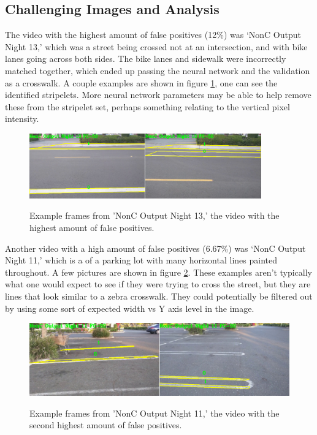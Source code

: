 \documentclass[12pt]{ucthesis}
\newcommand{\captionfonts}{\small\bf\ssp}
\begin{document}
\subsection{Challenging Images and Analysis}

The video with the highest amount of false positives (12\%) was `NonC Output Night 13,' which was a street being crossed not at an intersection, and with bike lanes going across both sides. The bike lanes and sidewalk were incorrectly matched together, which ended up passing the neural network and the validation as a crosswalk. A couple examples are shown in figure \ref{fig:worstFalsePosPic}, one can see the identified stripelets. More neural network parameters may be able to help remove these from the stripelet set, perhaps something relating to the vertical pixel intensity. 

\begin{figure}[t]
\begin{center}
\includegraphics[width=10cm]{NonCWorstCwalk.png}
\captionfonts
\caption[Worst False Positive Examples]{Example frames from 'NonC Output Night 13,' the video with the highest amount of false positives.}
\label{fig:worstFalsePosPic}
\end{center}
\end{figure}

Another video with a high amount of false positives (6.67\%) was `NonC Output Night 11,' which is a of a parking lot with many horizontal lines painted throughout.  A few pictures are shown in figure \ref{fig:2ndworstFalsePosPic}. These examples aren't typically what one would expect to see if they were trying to cross the street, but they are lines that look similar to a zebra crosswalk. They could potentially be filtered out by using some sort of expected width vs Y axis level in the image. 

\begin{figure}[t]
\begin{center}
\includegraphics[width=14cm]{NonC2ndWorstCwalk.png}
\captionfonts
\caption[Second Worst False Positive Examples]{Example frames from 'NonC Output Night 11,' the video with the second highest amount of false positives.}
\label{fig:2ndworstFalsePosPic}
\end{center}
\end{figure}
\end{document}
